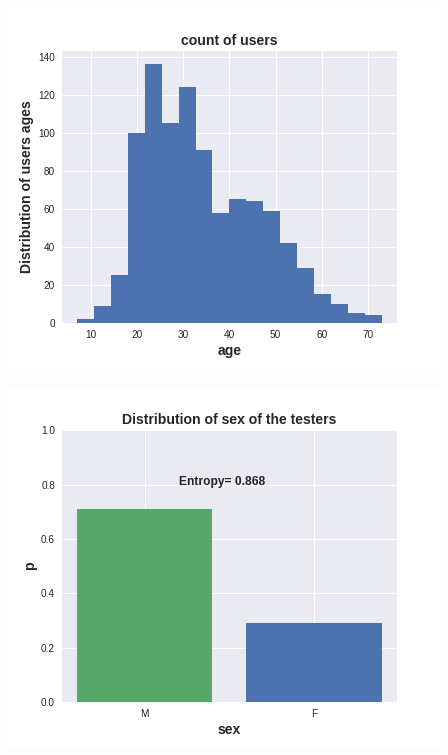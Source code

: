 \documentclass[11pt,a4paper]{article}
\begin{document}
\begin{minipage}[t]{0.33\textwidth}
	\includegraphics[width=\textwidth]{Bilder/age_dist.png}
\end{minipage}
\begin{minipage}[t]{0.33\textwidth}
	\includegraphics[width=\textwidth]{Bilder/sex_dist.png}
\end{minipage}
\end{document}
